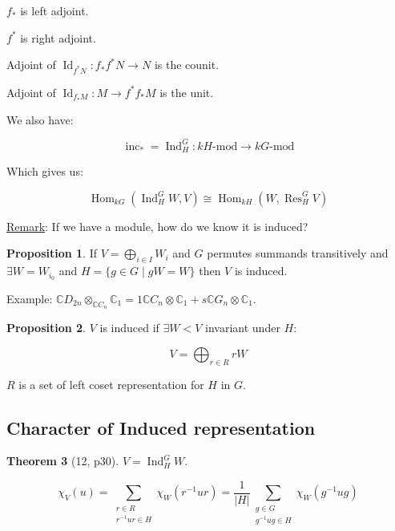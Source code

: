 \documentclass{article}
\theoremstyle{definition}
\newtheorem{theorem}{Theorem}
\newtheorem{proposition}[theorem]{Proposition}
\begin{document}
\(f_{\ast}\) is left adjoint.

\(f^{\ast}\) is right adjoint.

Adjoint of \(\operatorname{Id}_{f^{\ast} N}: \boxed{f_{\ast} f^{\ast} N \to N}\) is the counit.

Adjoint of \(\operatorname{Id}_{f_{\ast} M}: \boxed{M \to f^{\ast} f_{\ast} M}\) is the unit. 

We also have:

\[
    \operatorname{inc}_{\ast} = \operatorname{Ind}_H^G : kH \text{-mod} \to kG \text{-mod} 
\]

Which gives us:

\[
    \operatorname{Hom}_{kG}(\operatorname{Ind}_H^G W, V) \cong \operatorname{Hom}_{kH}(W, \operatorname{Res}_H^G V)
\]

\underline{Remark}: If we have a module, how do we know it is induced?

\begin{proposition}
    If \(V = \bigoplus_{i\in I} W_i\) and \(G\) permutes summands transitively and \(\exists W = W_{i_0}\) and \(H = \{ g\in G \mid g W = W \} \) then \(V\) is induced.
\end{proposition}

Example: \(\mathbb{C} D_{2n} \otimes_{\mathbb{C} C_n} \mathbb{C}_1 = 1 \mathbb{C} C_n \otimes \mathbb{C}_1 + s \mathbb{C} G_n \otimes \mathbb{C}_1\).


\begin{proposition}
    \(V\) is induced if \(\exists W < V\) invariant under \(H\):

    \[
        V = \bigoplus_{r\in R} rW
    \]

    \(R\) is a set of left coset representation for \(H\) in \(G\).
\end{proposition}

\subsection*{Character of Induced representation}

\begin{theorem}
    [12, p30] \(V = \operatorname{Ind}_H^G W\).

    \[
        \chi_V (u) = \sum_{\substack{r\in R \\ r ^{-1} u r \in H}} \chi_W (r ^{-1} u r) = \frac{1}{\vert H \vert} \sum_{\substack{g\in G \\ g ^{-1} u g \in H}} \chi_W (g ^{-1} u g) 
    \]
\end{theorem}
\end{document}
